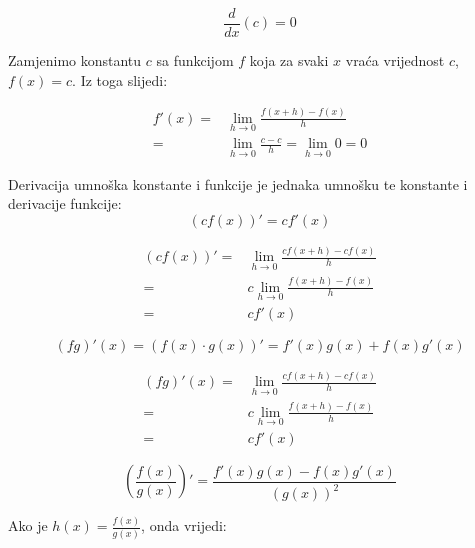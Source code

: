\begin{multicols}{2}
\begin{propositionbox}
    $$
        \frac{d}{dx}(c) = 0
    $$
\end{propositionbox}

Zamjenimo konstantu $c$ sa funkcijom $f$ koja za svaki $x$ vraća vrijednost $c$, $f(x)=c$.
Iz toga slijedi:

\begin{align*}
    f'(x) =& \lim_{h\to 0}\frac{f(x+h)-f(x)}{h}\\
          =& \lim_{h\to 0}\frac{c - c}{h} = \lim_{h\to 0}0 = 0
\end{align*}

\begin{propositionbox}
    Derivacija umnoška konstante i funkcije je jednaka umnošku te konstante i derivacije funkcije:
    $$
        (cf(x))' = cf'(x)
    $$
\end{propositionbox}

\begin{align*}
    (cf(x))'=&\lim_{h\to 0}\frac{cf(x+h)-cf(x)}{h}\\
            =&c\lim_{h\to 0}\frac{f(x+h)-f(x)}{h}\\
            =&cf'(x)
\end{align*}

\end{multicols}

\begin{propositionbox}
    \label{eq:diff_prod}
    $$
        (fg)'(x) = (f(x)\cdot g(x))' = f'(x)g(x) + f(x)g'(x)
    $$
\end{propositionbox}

\begin{align*}
    (fg)'(x)=&\lim_{h\to 0}\frac{cf(x+h)-cf(x)}{h}\\
    =&c\lim_{h\to 0}\frac{f(x+h)-f(x)}{h}\\
    =&cf'(x)
\end{align*}

\begin{propositionbox}
    $$
        \left(\frac{f(x)}{g(x)}\right)' = \frac{f'(x)g(x) - f(x)g'(x)}{(g(x))^2}
    $$
\end{propositionbox}

Ako je $h(x) = \frac{f(x)}{g(x)}$, onda vrijedi:

